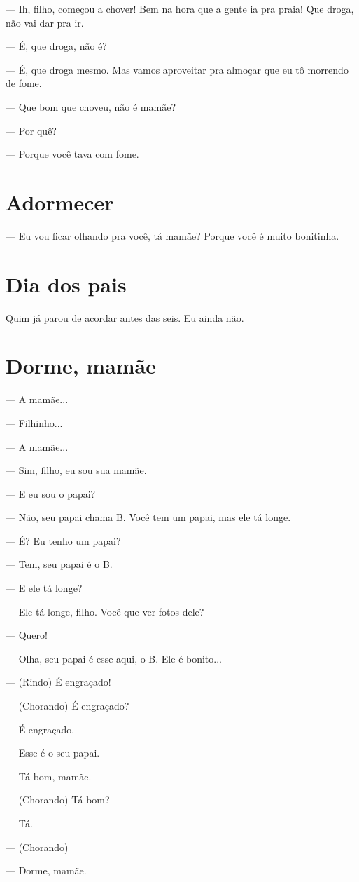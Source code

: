 {--- Ih, filho, começou a chover! Bem na hora que a gente ia pra praia!
Que droga, não vai dar pra ir.

--- É, que droga, não é?

--- É, que droga mesmo. Mas vamos aproveitar pra almoçar que eu tô
morrendo de fome.

--- Que bom que choveu, não é mamãe?

--- Por quê?

--- Porque você tava com fome.

\chapter{Adormecer}\label{adormecer}

--- Eu vou ficar olhando pra você, tá mamãe? Porque você é muito
bonitinha.}

\chapter{Dia dos pais}\label{dia-dos-pais}

{Quim já parou de acordar antes das seis. Eu ainda
não.}

\chapter{Dorme, mamãe}\label{dorme-mamuxe3e}

{\parindent0pt\parskip1pt\raggedright
--- A mamãe...

--- Filhinho...

--- A mamãe...

--- Sim, filho, eu sou sua mamãe.

--- E eu sou o papai?

--- Não, seu papai chama B. Você tem um papai, mas ele tá longe.

--- É? Eu tenho um papai?

--- Tem, seu papai é o B.

--- E ele tá longe?

--- Ele tá longe, filho. Você que ver fotos dele?

--- Quero!

--- Olha, seu papai é esse aqui, o B. Ele é bonito...

--- (Rindo) É engraçado!

--- (Chorando) É engraçado?

--- É engraçado.

--- Esse é o seu papai.

--- Tá bom, mamãe.

--- (Chorando) Tá bom?

--- Tá.

--- (Chorando)

--- Dorme, mamãe.}


